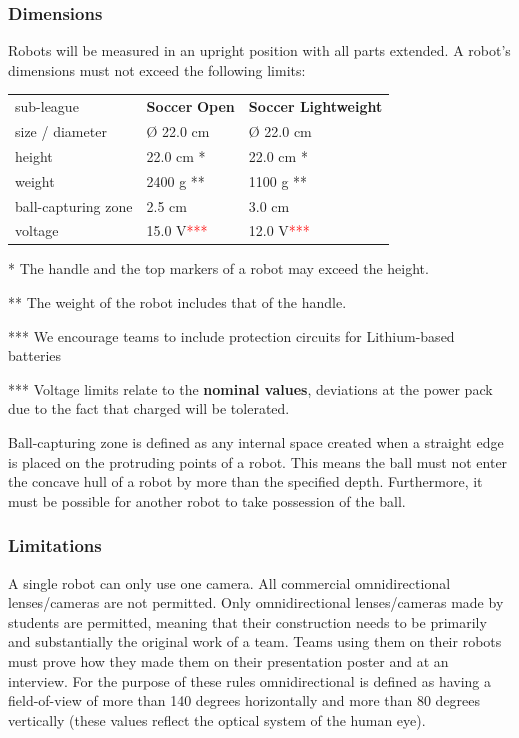 \documentclass{article}
\begin{document}
\subsubsection{Dimensions \label{ref-055}}

Robots will be measured in an upright position with all parts extended. A
robot's dimensions must not exceed the following limits:

\begin{table}
\begin{tabularx}{\textwidth}{
p{}
p{}
p{}}
sub-league & \textbf{Soccer} \textbf{Open} & \textbf{Soccer Lightweight} \\
size / diameter & \O{} 22.0 cm & \O{} 22.0 cm \\
height & 22.0 cm * & 22.0 cm * \\
weight & 2400 g ** & 1100 g ** \\
ball-capturing zone & 2.5 cm & 3.0 cm \\
voltage & 15.0 V\textcolor{red}{***} & 12.0 V\textcolor{red}{***} \\

\end{tabularx}

\end{table}

* The handle and the top markers of a robot may exceed the height.

** The weight of the robot includes that of the handle.

*** We encourage teams to include protection circuits for Lithium-based
batteries

*** Voltage limits relate to the \textbf{nominal values}, deviations at the power pack
due to the fact that charged will be tolerated.

Ball-capturing zone is defined as any internal space created when a straight
edge is placed on the protruding points of a robot. This means the ball must
not enter the concave hull of a robot by more than the specified depth.
Furthermore, it must be possible for another robot to take possession of the
ball.

\subsubsection{Limitations\label{ref-056}}

A single robot can only use one camera. All commercial omnidirectional
lenses/cameras are not permitted. Only omnidirectional lenses/cameras made by
students are permitted, meaning that their construction needs to be primarily
and substantially the original work of a team. Teams using them on their robots
must prove how they made them on their presentation poster and at an interview.
For the purpose of these rules omnidirectional is defined as having a
field-of-view of more than 140 degrees horizontally and more than 80 degrees
vertically (these values reflect the optical system of the human eye).
\end{document}
